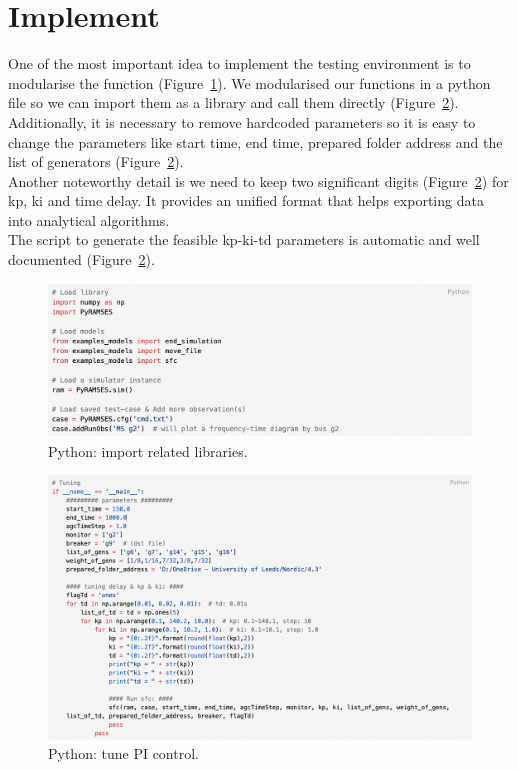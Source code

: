 \section{Implement} %

One of the most important idea to implement the testing environment is to modularise the function (Figure~\ref{4_3_code1}). We modularised our functions in a python file so we can import them as a library and call them directly (Figure~\ref{4_3_code2}). Additionally, it is necessary to remove hardcoded parameters so it is easy to change the parameters like start time, end time, prepared folder address and the list of generators (Figure~\ref{4_3_code2}).\\

Another noteworthy detail is we need to keep two significant digits (Figure~\ref{4_3_code2}) for kp, ki and time delay. It provides an unified format that helps exporting data into analytical algorithms.\\

The script to generate the feasible kp-ki-td parameters is automatic and well documented (Figure~\ref{4_3_code2}).\\

\begin{figure}[htbp]
\centering
\includegraphics[width = \textwidth]{figure/4_3_code1.png}
\caption{Python: import related libraries.}
\label{4_3_code1}
\end{figure}

\begin{figure}[htbp]
\centering
\includegraphics[width = \textwidth]{figure/4_3_code2.png}
\caption{Python: tune PI control.}
\label{4_3_code2}
\end{figure}